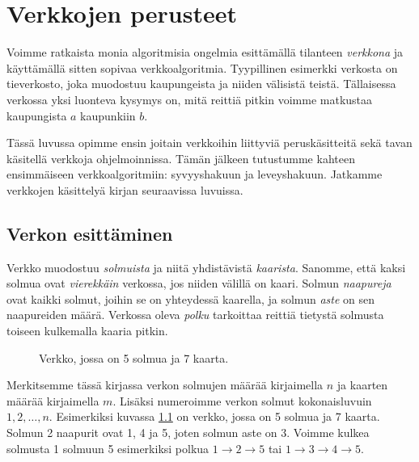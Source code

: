 \chapter{Verkkojen perusteet}

Voimme ratkaista monia algoritmisia ongelmia
esittämällä tilanteen \emph{verkkona} ja käyttämällä sitten
sopivaa verkkoalgoritmia.
Tyypillinen esimerkki verkosta on tieverkosto,
joka muodostuu kaupungeista ja niiden välisistä teistä.
Tällaisessa verkossa yksi luonteva kysymys on,
mitä reittiä pitkin voimme matkustaa kaupungista $a$ kaupunkiin $b$.

Tässä luvussa opimme ensin joitain verkkoihin liittyviä
peruskäsitteitä sekä tavan käsitellä verkkoja ohjelmoinnissa.
Tämän jälkeen tutustumme kahteen ensimmäiseen verkkoalgoritmiin:
syvyyshakuun ja leveyshakuun.
Jatkamme verkkojen käsittelyä kirjan seuraavissa luvuissa.

\section{Verkon esittäminen}

Verkko muodostuu \emph{solmuista} ja
niitä yhdistävistä \emph{kaarista}.
Sanomme, että kaksi solmua ovat \emph{vierekkäin} verkossa,
jos niiden välillä on kaari.
Solmun \emph{naapureja} ovat kaikki solmut,
joihin se on yhteydessä kaarella,
ja solmun \emph{aste} on sen naapureiden määrä.
Verkossa oleva \emph{polku} tarkoittaa reittiä
tietystä solmusta toiseen kulkemalla kaaria pitkin.

\begin{figure}
\center
\begin{center}
\end{center}
\caption{Verkko, jossa on 5 solmua ja 7 kaarta.}
\label{fig:veresi}
\end{figure}

Merkitsemme tässä kirjassa verkon solmujen
määrää kirjaimella $n$ ja kaarten määrää
kirjaimella $m$.
Lisäksi numeroimme verkon solmut kokonaisluvuin
$1,2,\dots,n$.
Esimerkiksi kuvassa \ref{fig:veresi} on verkko,
jossa on 5 solmua ja 7 kaarta.
Solmun 2 naapurit ovat 1, 4 ja 5,
joten solmun aste on 3.
Voimme kulkea solmusta 1 solmuun 5
esimerkiksi polkua $1 \rightarrow 2 \rightarrow 5$
tai $1 \rightarrow 3 \rightarrow 4 \rightarrow 5$.

